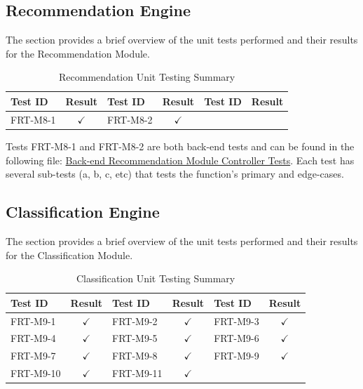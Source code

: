 \documentclass[12pt, titlepage]{article}
\begin{document}
\subsection{Recommendation Engine}

The section provides a brief overview of the unit tests performed and their results for the
Recommendation Module.

\begin{longtable}{|l|c|l|c|l|c|}
  \caption{Recommendation Unit Testing Summary} \label{Recommendation Unit Test Summary} \\
  \toprule
  \textbf{Test ID} & \textbf{Result} & \textbf{Test ID} & \textbf{Result} & \textbf{Test ID} & \textbf{Result} \\
  \midrule
  FRT-M8-1 & $\checkmark$ & FRT-M8-2 & $\checkmark$ &  &  \\
  \bottomrule
\end{longtable}

Tests FRT-M8-1 and FRT-M8-2 are both back-end tests and can be found in the following file: \href{https://github.com/grocery-spending-tracker/grocery-spending-tracker-backend/blob/314b/unit-test/tests/controllers/recommendationController.test.js}{Back-end Recommendation Module Controller Tests}. Each test has several sub-tests (a, b, c, etc) that tests the function's primary and edge-cases.

\subsection{Classification Engine}

The section provides a brief overview of the unit tests performed and their results for the
Classification Module.

\begin{longtable}{|l|c|l|c|l|c|}
  \caption{Classification Unit Testing Summary} \label{Classification Unit Test Summary} \\
  \toprule
  \textbf{Test ID} & \textbf{Result} & \textbf{Test ID} & \textbf{Result} & \textbf{Test ID} & \textbf{Result} \\
  \midrule
  FRT-M9-1 & $\checkmark$ & FRT-M9-2 & $\checkmark$ & FRT-M9-3 & $\checkmark$ \\
  \midrule
  FRT-M9-4 & $\checkmark$ & FRT-M9-5 & $\checkmark$ & FRT-M9-6 & $\checkmark$ \\
  \midrule
  FRT-M9-7 & $\checkmark$ & FRT-M9-8 & $\checkmark$  & FRT-M9-9 & $\checkmark$ \\
  \midrule
  FRT-M9-10 & $\checkmark$ & FRT-M9-11 & $\checkmark$  &  &  \\
  \bottomrule
\end{longtable}
\end{document}
